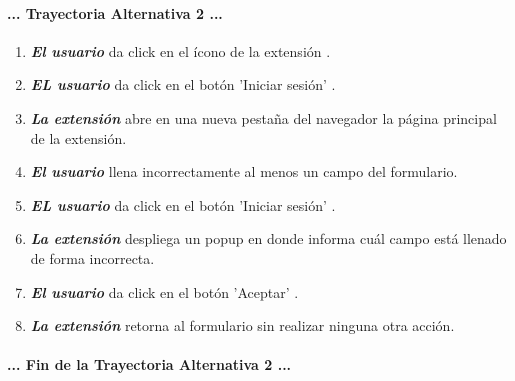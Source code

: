 \documentclass[12pt, a4paper, titlepage]{report}
\newcommand*{\img}[1]{%
    \raisebox{-.3\baselineskip}{%
        \texttt{[image: \#1]}%
    }%
}
\begin{document}
			    \paragraph{... Trayectoria Alternativa 2 ...}
				\begin{enumerate}
					
					\item \textbf{\textit{El usuario}} da click en el ícono de la extensión \img{imagenes/Disenio/Componente_1/UI_icon_escom.png}.
					
					\item \textbf{\textit{EL usuario}} da click en el botón 'Iniciar sesión' \img{imagenes/Disenio/Componente_1/UI_btn_login.png}.
					
					\item \textbf{\textit{La extensión}} abre en una nueva pestaña del navegador la página principal de la extensión.
					
					\item \textbf{\textit{El usuario}} llena incorrectamente al menos un campo del formulario.
					
					\item \textbf{\textit{EL usuario}} da click en el botón 'Iniciar sesión' \img{imagenes/Disenio/Componente_1/UI_btn_login.png}.
					
					\item \textbf{\textit{La extensión}} despliega un popup en donde informa cuál campo está llenado de forma incorrecta.
					
					\item \textbf{\textit{El usuario}} da click en el botón 'Aceptar' \img{imagenes/Disenio/Componente_1/UI_btn_accept.png}.
					
					\item \textbf{\textit{La extensión}} retorna al formulario sin realizar ninguna otra acción.
					
				\end{enumerate}
				\paragraph{... Fin de la Trayectoria Alternativa 2 ...}
			    
			    
\end{document}

